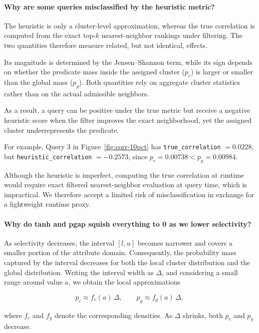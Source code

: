 \paragraph{Why are some queries misclassified by the heuristic metric?}

The heuristic is only a cluster-level approximation, whereas the true correlation is computed from the exact top-\(k\) nearest-neighbor rankings under filtering. The two quantities therefore measure related, but not identical, effects.

Its magnitude is determined by the Jensen--Shannon term, while its sign depends on whether the predicate mass inside the assigned cluster (\(p_c\)) is larger or smaller than the global mass (\(p_g\)). Both quantities rely on aggregate cluster statistics rather than on the actual admissible neighbors.

As a result, a query can be positive under the true metric but receive a negative heuristic score when the filter improves the exact neighborhood, yet the assigned cluster underrepresents the predicate.

For example, Query 3 in Figure~\ref{fig:corr-10pct} has \texttt{true\_correlation} \(= 0.0228\), but \texttt{heuristic\_correlation} \(= -0.2573\), since \(p_c = 0.00738 < p_g = 0.00984\).

Although the heuristic is imperfect, computing the true correlation at runtime would require exact filtered nearest-neighbor evaluation at query time, which is impractical. We therefore accept a limited risk of misclassification in exchange for a lightweight runtime proxy.

\paragraph{Why do tanh and pgap squish everything to 0 as we lower selectivity?}\label{par:shrink-toward-zero}
As selectivity decreases, the interval \([l,u]\) becomes narrower and covers a smaller portion of the attribute domain. Consequently, the probability mass captured by the interval decreases for both the local cluster distribution and the global distribution. Writing the interval width as \(\Delta\), and considering a small range around value \(a\), we obtain the local approximations

\[
p_c \approx f_c(a)\,\Delta,
\qquad
p_g \approx f_g(a)\,\Delta,
\]

where \(f_c\) and \(f_g\) denote the corresponding densities. As \(\Delta\) shrinks, both \(p_c\) and \(p_g\) decrease.

